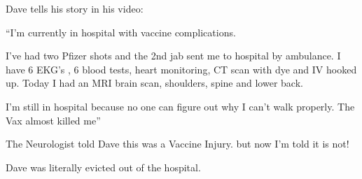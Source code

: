 Dave tells his story in his video:

“I’m currently in hospital with vaccine complications.

I’ve had two Pfizer shots and the 2nd jab sent me to hospital by ambulance. I
have 6 EKG’s , 6 blood tests, heart monitoring, CT scan with dye and IV hooked
up. Today I had an MRI brain scan, shoulders, spine and lower back.

I’m still in hospital because no one can figure out why I can’t walk
properly. The Vax almost killed me”

The Neurologist told Dave this was a Vaccine Injury. but now I’m told it is not!

Dave was literally evicted out of the hospital.

